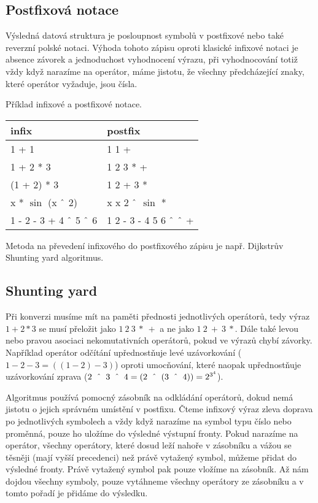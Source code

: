 \documentclass[11pt]{article}
\newcommand\CARET{\mathbin{\char`\^}}
\begin{document}
\subsection{Postfixová notace}
Výsledná datová struktura je posloupnost symbolů v postfixové nebo také
reverzní polské notaci. Výhoda tohoto zápisu oproti klasické infixové notaci
je absence závorek a jednoduchost vyhodnocení výrazu, při vyhodnocování totiž
vždy když narazíme na operátor, máme jistotu, že všechny předcházející znaky, 
které operátor vyžaduje, jsou čísla.

Příklad infixové a postfixové notace.
\begin{center}
\begin{tabular}{|l|l|}
\hline
infix & postfix \\
\hline
1 + 1 & 1 1 + \\
1 + 2 * 3 & 1 2 3 * + \\
(1 + 2) * 3 & 1 2 + 3 * \\
x * $\sin$ (x $\CARET$ 2) & x x 2 $\CARET$ $\sin$ * \\
1 - 2 - 3 + 4 $\CARET$ 5 $\CARET$ 6 & 1 2 - 3 - 4 5 6 $\CARET$ $\CARET$ + \\
\hline
\end{tabular}
\end{center}

Metoda na převedení infixového do postfixového zápisu je např. Dijkstrův
Shunting yard algoritmus.


\subsection{Shunting yard}
Při konverzi musíme mít na paměti přednosti jednotlivých operátorů, tedy výraz
$1 + 2 * 3$ se musí přeložit jako $1~2~3~*~+$ a ne jako $1~2~+~3~*$.  Dále také
levou nebo pravou asociaci nekomutativních operátorů, pokud ve výrazů chybí
závorky.  Například operátor odčítání upřednostňuje levé uzávorkování ($1 - 2 -
3 = ((1 - 2) - 3)$) oproti umocňování, které naopak upřednostňuje uzávorkování
zprava ($2~\CARET~3~\CARET~4 = (2~\CARET~(3~\CARET~4)) = 2^{3^4}$).

Algoritmus používá pomocný zásobník na odkládání operátorů, dokud nemá jistotu
o jejich správném umístění v postfixu. Čteme infixový výraz zleva doprava po
jednotlivých symbolech a vždy když narazíme na symbol typu číslo nebo proměnná,
pouze ho uložíme do výsledné výstupní fronty. Pokud narazíme na operátor,
všechny operátory, které dosud leží nahoře v zásobníku a vážou se těsněji (mají
vyšší precedenci) než právě vytažený symbol, můžeme přidat do výsledné fronty.
Právě vytažený symbol pak pouze vložíme na zásobník. Až nám dojdou všechny
symboly, pouze vytáhneme všechny operátory ze zásobníku a v tomto pořadí je
přidáme do výsledku. \\
\end{document}
